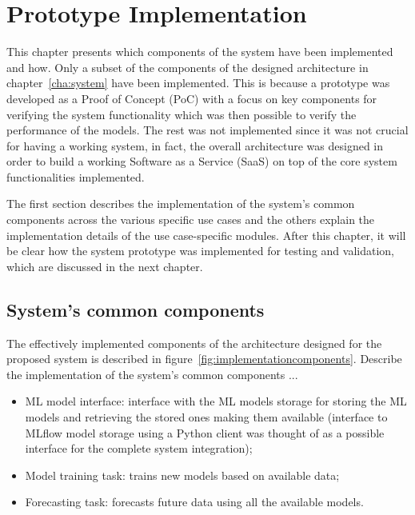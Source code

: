 \chapter{Prototype Implementation}
\label{cha:implementation}
\vspace{0.4 cm}

This chapter presents which components of the system have been implemented and how.
Only a subset of the components of the designed architecture in chapter~\ref{cha:system} have been implemented.
This is because a prototype was developed as a Proof of Concept (PoC) with a focus on key components for verifying the system functionality which was then possible to verify the performance of the models.
The rest was not implemented since it was not crucial for having a working system, in fact, the overall architecture was designed in order to build a working Software as a Service (SaaS) on top of the core system functionalities implemented.

The first section describes the implementation of the system's common components across the various specific use cases and the others explain the implementation details of the use case-specific modules.
After this chapter, it will be clear how the system prototype was implemented for testing and validation, which are discussed in the next chapter.


\section{System's common components}
\label{sec:componentsimpl}
\vspace{0.2 cm}

The effectively implemented components of the architecture designed for the proposed system is described in figure~\ref{fig:implementationcomponents}.
Describe the implementation of the system's common components ...
\begin{itemize}
  \item ML model interface: interface with the ML models storage for storing the ML models and retrieving the stored ones making them available (interface to MLflow model storage using a Python client was thought of as a possible interface for the complete system integration);
  \item Model training task: trains new models based on available data;
  \item Forecasting task: forecasts future data using all the available models.
\end{itemize}

